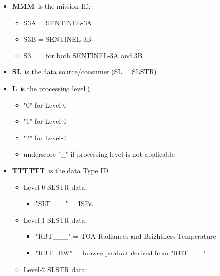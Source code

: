 \documentclass[sigplan,screen]{acmart}
\begin{document}
\begin{itemize}
\item
  \textbf{MMM}~is the mission ID:

  \begin{itemize}
  \item
    S3A = SENTINEL-3A
  \item
    S3B = SENTINEL-3B
  \item
    S3\_ = for both SENTINEL-3A and 3B
  \end{itemize}
\item
  \textbf{SL}~is the data source/consumer (SL = SLSTR)
\item
  \textbf{L}~is the processing level
(
  \begin{itemize}
  \item
    "0" for Level-0
  \item
    "1" for Level-1
  \item
    "2" for Level-2
  \item
    underscore "\_" if processing level is not applicable
  \end{itemize}
\item
  \textbf{TTTTTT}~is the data Type ID

  \begin{itemize}
  \item
    Level 0 SLSTR data:

    \begin{itemize}
    \item
      "SLT\_\_\_" = ISPs.
    \end{itemize}
  \item
    Level-1 SLSTR data:

    \begin{itemize}
    \item
      "RBT\_\_\_" = TOA Radiances and Brightness Temperature
    \item
      "RBT\_BW" = browse product derived from "RBT\_\_\_".
    \end{itemize}
  \item
    Level-2 SLSTR data:


\end{itemize}
\end{itemize}
\end{document}

